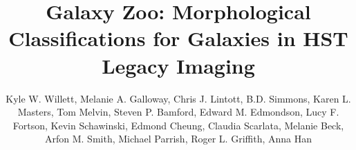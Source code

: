 \documentclass[twocolumn]{aastex6}
\begin{document}

\title{Galaxy Zoo: Morphological Classifications for Galaxies in HST Legacy Imaging}

\author{Kyle W. Willett, Melanie A. Galloway, Chris J. Lintott, B.D. Simmons, Karen L. Masters, Tom Melvin, Steven P. Bamford, Edward M. Edmondson, Lucy F. Fortson, Kevin Schawinski, Edmond Cheung, Claudia Scarlata, Melanie Beck, Arfon M. Smith, Michael Parrish, Roger L. Griffith, Anna Han
}
%
%
\end{document}
